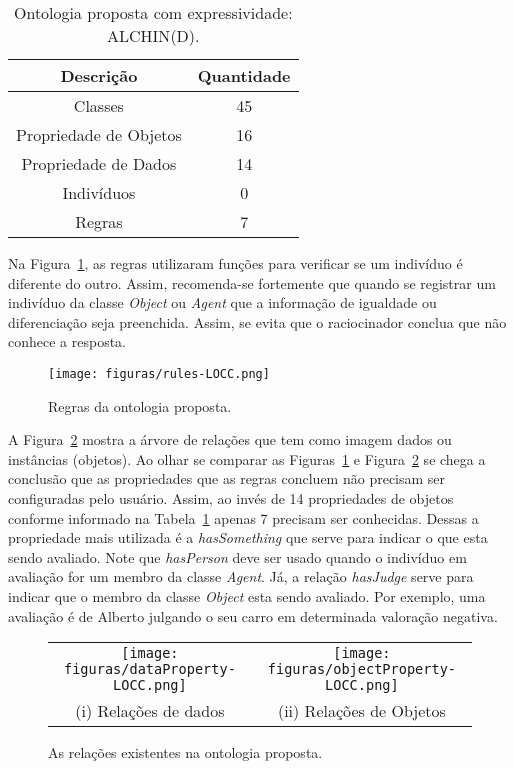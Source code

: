 \begin{table}
	\caption{Ontologia proposta com expressividade: ALCHIN(D).}
	\label{tab:oa:geral}
	\begin{center}
	\begin{tabular}{|c|c|}
		\hline
		Descrição & Quantidade \\ \hline
		Classes &  45 		\\ \hline
		Propriedade de Objetos & 16 \\ \hline
		Propriedade de Dados & 14 \\ \hline
		Indivíduos &  0		\\ \hline
		Regras & 7 \\ \hline
	\end{tabular}
	\end{center}
\end{table}

Na Figura~\ref{fig:rlocc}, as regras utilizaram funções para verificar se
um indivíduo é diferente do outro. Assim, recomenda-se fortemente que quando
se registrar um indivíduo da classe \emph{Object} ou \emph{Agent} que a
informação de igualdade ou diferenciação seja preenchida\dev{}. Assim, se
evita que o raciocinador conclua que não conhece a resposta.

\begin{figure}[t]
  \centering
  \texttt{[image: figuras/rules-LOCC.png]}
  \caption{Regras da ontologia proposta.}
  \label{fig:rlocc}
\end{figure}

A Figura~\ref{fig:kplocc} mostra a árvore de relações que tem como imagem
dados ou instâncias (objetos). Ao olhar se comparar as Figuras~\ref{fig:rlocc}
e Figura~\ref{fig:kplocc} se chega a conclusão que as propriedades que as
regras concluem não precisam ser configuradas pelo usuário. Assim, ao invés de
14 propriedades de objetos conforme informado na Tabela~\ref{tab:oa:geral}
apenas 7 precisam ser conhecidas. Dessas a propriedade mais utilizada é a
\emph{hasSomething} que serve para indicar o que esta sendo avaliado. Note que
\emph{hasPerson} deve ser usado quando o indivíduo em avaliação for um membro
da classe \emph{Agent}. Já, a relação \emph{hasJudge} serve para indicar que o
membro da classe \emph{Object} esta sendo avaliado. Por exemplo, uma avaliação
é de Alberto julgando o seu carro em determinada valoração
negativa.

\begin{figure}[b]
  \centering
  \begin{tabular}{cc}
  \texttt{[image: figuras/dataProperty-LOCC.png]} & \texttt{[image: figuras/objectProperty-LOCC.png]} \\
  (i) Relações de dados & (ii) Relações de Objetos
  \end{tabular}
  \caption{As relações existentes na ontologia proposta.}
  \label{fig:kplocc}
\end{figure}

